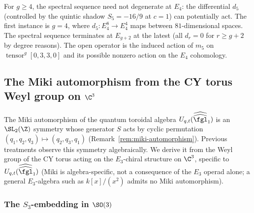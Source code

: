 \begin{remark}[Class \texorpdfstring{$M$}{M} at genus \texorpdfstring{$g \geq 4$}{g >= 4}]
\label{rem:class-m-genus-geq-4}
For $g \geq 4$, the spectral sequence need not degenerate at $E_4$: the differential $d_5$ (controlled by the quintic shadow $S_5 = -16/9$ at $c = 1$) can potentially act. The first instance is $g = 4$, where $d_5 \colon E_4^8 \to E_4^4$ maps between $81$-dimensional spaces. The spectral sequence terminates at $E_{g+2}$ at the latest (all $d_r = 0$ for $r \geq g + 2$ by degree reasons). The open operator is the induced action of $m_5$ on $\operatorname{tensor}^g [0,3,3,0]$ and its possible nonzero action on the $E_4$ cohomology.
\end{remark}

\subsection{The Miki automorphism from the CY torus Weyl group on \texorpdfstring{$\C^3$}{C-3}}
\label{subsec:miki-from-e3}

The Miki automorphism of the quantum toroidal algebra $U_{q,t}(\widehat{\widehat{\fgl}}_1)$ is an $\SL_2(\Z)$ symmetry whose generator $S$ acts by cyclic permutation $(q_1,q_2,q_3) \mapsto (q_2,q_3,q_1)$ (Remark~\ref{rem:miki-automorphism}). Previous treatments observe this symmetry algebraically. We derive it from the Weyl group of the CY torus acting on the $E_3$-chiral structure on $\C^3$, specific to $U_{q,t}(\widehat{\widehat{\fgl}}_1)$ (Miki is algebra-specific, not a consequence of the $E_3$ operad alone; a general $E_3$-algebra such as $k[x]/(x^2)$ admits no Miki automorphism).

\subsubsection{The \texorpdfstring{$S_3$}{S-3}-embedding in \texorpdfstring{$\SO(3)$}{SO(3)}}

